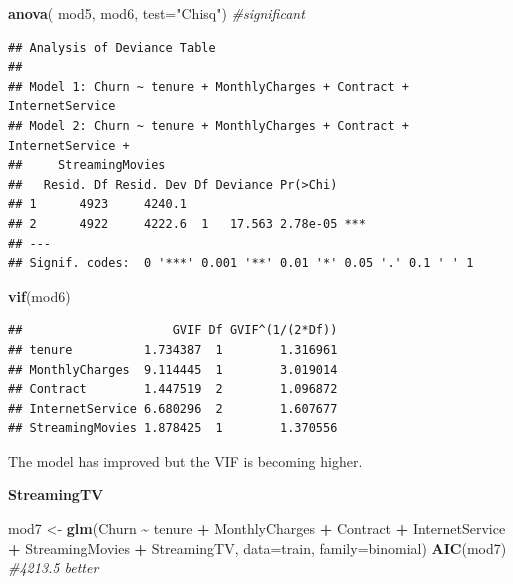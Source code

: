 \documentclass[
  twoside]{article}
\newenvironment{Shaded}{\begin{snugshade}}{\end{snugshade}}
\newcommand{\AttributeTok}[1]{\textcolor[rgb]{0.13,0.29,0.53}{#1}}
\newcommand{\CommentTok}[1]{\textcolor[rgb]{0.56,0.35,0.01}{\textit{#1}}}
\newcommand{\FunctionTok}[1]{\textcolor[rgb]{0.13,0.29,0.53}{\textbf{#1}}}
\newcommand{\NormalTok}[1]{#1}
\newcommand{\OtherTok}[1]{\textcolor[rgb]{0.56,0.35,0.01}{#1}}
\newcommand{\SpecialCharTok}[1]{\textcolor[rgb]{0.81,0.36,0.00}{\textbf{#1}}}
\newcommand{\StringTok}[1]{\textcolor[rgb]{0.31,0.60,0.02}{#1}}
\begin{document}
\begin{Shaded}
\begin{Highlighting}[]
\FunctionTok{anova}\NormalTok{( mod5, mod6,  }\AttributeTok{test=}\StringTok{"Chisq"}\NormalTok{) }\CommentTok{\#significant}
\end{Highlighting}
\end{Shaded}

\begin{verbatim}
## Analysis of Deviance Table
## 
## Model 1: Churn ~ tenure + MonthlyCharges + Contract + InternetService
## Model 2: Churn ~ tenure + MonthlyCharges + Contract + InternetService + 
##     StreamingMovies
##   Resid. Df Resid. Dev Df Deviance Pr(>Chi)    
## 1      4923     4240.1                         
## 2      4922     4222.6  1   17.563 2.78e-05 ***
## ---
## Signif. codes:  0 '***' 0.001 '**' 0.01 '*' 0.05 '.' 0.1 ' ' 1
\end{verbatim}

\begin{Shaded}
\begin{Highlighting}[]
\FunctionTok{vif}\NormalTok{(mod6)}
\end{Highlighting}
\end{Shaded}

\begin{verbatim}
##                     GVIF Df GVIF^(1/(2*Df))
## tenure          1.734387  1        1.316961
## MonthlyCharges  9.114445  1        3.019014
## Contract        1.447519  2        1.096872
## InternetService 6.680296  2        1.607677
## StreamingMovies 1.878425  1        1.370556
\end{verbatim}

The model has improved but the VIF is becoming higher.

\textbf{StreamingTV}

\begin{Shaded}
\begin{Highlighting}[]
\NormalTok{mod7 }\OtherTok{\textless{}{-}} \FunctionTok{glm}\NormalTok{(Churn }\SpecialCharTok{\textasciitilde{}}\NormalTok{ tenure }\SpecialCharTok{+}\NormalTok{ MonthlyCharges }\SpecialCharTok{+}\NormalTok{ Contract }\SpecialCharTok{+}\NormalTok{ InternetService }\SpecialCharTok{+} 
\NormalTok{              StreamingMovies }\SpecialCharTok{+}\NormalTok{ StreamingTV, }\AttributeTok{data=}\NormalTok{train, }\AttributeTok{family=}\NormalTok{binomial)}
\FunctionTok{AIC}\NormalTok{(mod7) }\CommentTok{\#4213.5 better}
\end{Highlighting}
\end{Shaded}
\end{document}
